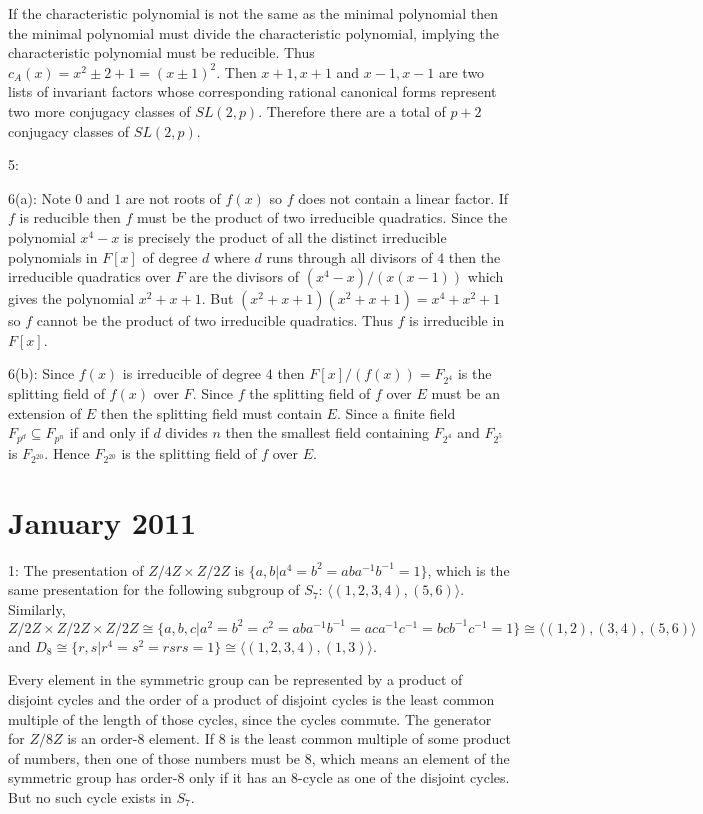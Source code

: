 \documentclass[12pt]{article}
\begin{document}
If the characteristic polynomial is not the same as the minimal polynomial then the minimal polynomial must divide the characteristic polynomial, implying the characteristic polynomial must be reducible.  Thus $c_A(x) = x^2 \pm 2 +1 = (x\pm 1)^2$.  Then $x+1, x+1$ and $x-1, x-1$ are two lists of invariant factors whose corresponding rational canonical forms represent two more conjugacy classes of $SL(2,p)$.  Therefore there are a total of $p+2$ conjugacy classes of $SL(2,p)$. \newline

5: \newline

6(a): Note $0$ and $1$ are not roots of $f(x)$ so $f$ does not contain a linear factor.  If $f$ is reducible then $f$ must be the product of two irreducible quadratics.  Since the polynomial $x^4 -x$ is precisely the product of all the distinct irreducible polynomials in $F[x]$ of degree $d$ where $d$ runs through all divisors of $4$ then the irreducible quadratics over $F$ are the divisors of $(x^4-x)/(x(x-1))$ which gives the polynomial $x^2+x+1$.  But $(x^2+x+1)(x^2+x+1) = x^4+x^2+1$ so $f$ cannot be the product of two irreducible quadratics.  Thus $f$ is irreducible in $F[x]$. \newline

6(b): Since $f(x)$ is irreducible of degree $4$ then $F[x]/(f(x)) = F_{2^4}$ is the splitting field of $f(x)$ over $F$.  Since $f$ the splitting field of $f$ over $E$ must be an extension of $E$ then the splitting field must contain $E$.  Since a finite field $F_{p^d} \subseteq F_{p^n}$ if and only if $d$ divides $n$ then the smallest field containing $F_{2^4}$ and $F_{2^5}$ is $F_{2^{20}}$.  Hence $F_{2^{20}}$ is the splitting field of $f$ over $E$.

\section{January 2011}
1: The presentation of $Z/4Z \times Z/2Z$ is $\{a,b|a^4=b^2=aba^{-1}b^{-1}=1 \}$, which is the same presentation for the following subgroup of $S_7$: $\langle (1,2,3,4),(5,6) \rangle$. Similarly, $Z/2Z \times Z/2Z \times Z/2Z \cong \{ a,b,c | a^2=b^2=c^2=aba^{-1}b^{-1}=aca^{-1}c^{-1}=bcb^{-1}c^{-1}=1 \} \cong \langle (1,2),(3,4),(5,6) \rangle$ and $D_8 \cong \{ r,s |r^4=s^2=rsrs=1 \} \cong \langle (1,2,3,4),(1,3) \rangle$. \newline

Every element in the symmetric group can be represented by a product of disjoint cycles and the order of a product of disjoint cycles is the least common multiple of the length of those cycles, since the cycles commute. The generator for $Z/8Z$ is an order-8 element. If 8 is the least common multiple of some product of numbers, then one of those numbers must be 8, which means an element of the symmetric group has order-8 only if it has an 8-cycle as one of the disjoint cycles. But no such cycle exists in $S_7$. \newline
\end{document}
